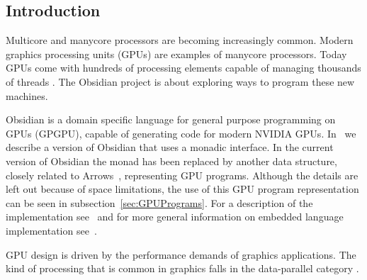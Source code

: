 








\subsection{Introduction} 

Multicore and manycore processors are becoming increasingly common. Modern 
graphics processing units (GPUs) are examples of manycore processors. Today 
GPUs come with hundreds of processing elements capable of managing thousands 
of threads . The Obsidian project is about exploring ways 
to program these new machines.  

Obsidian is a domain specific language for general purpose programming on 
GPUs (GPGPU), capable of generating code for modern NVIDIA GPUs. 
In~ we describe a version of Obsidian that uses a monadic 
interface. In the current version of Obsidian the monad has been replaced 
by another data structure, closely related to Arrows~, representing GPU programs. Although the details are 
left out because of space limitations, the use of this GPU program representation 
can be seen in subsection~\ref{sec:GPUPrograms}. For a description of the implementation 
see~ and for more general information on embedded language 
implementation see~.

GPU design is driven by the performance demands of graphics applications. 
The kind of processing that is common in graphics falls in the data-parallel 
category .



